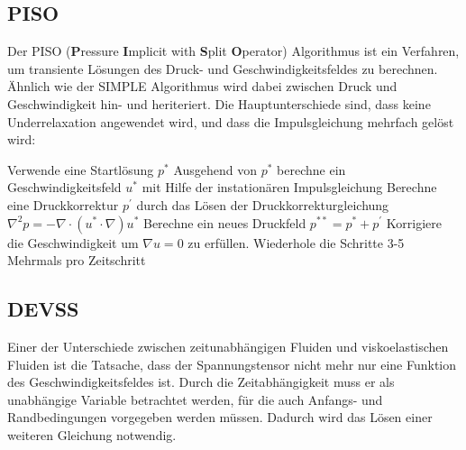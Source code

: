 \subsection{PISO}
Der \mbox{PISO} (\textbf{P}ressure \textbf{I}mplicit with \textbf{S}plit \textbf{O}perator)  Algorithmus ist ein Verfahren, um transiente Lösungen des Druck- und Geschwindigkeitsfeldes zu berechnen.\\
Ähnlich wie der \mbox{SIMPLE} Algorithmus wird dabei zwischen Druck und Geschwindigkeit hin- und heriteriert. Die Hauptunterschiede sind, dass keine Underrelaxation angewendet wird, und dass die Impulsgleichung mehrfach gelöst wird:
\begin{outline}[enumerate]
    \1 Verwende eine Startlösung $p^*$
    \1 Ausgehend von $p^*$ berechne ein Geschwindigkeitsfeld $u^*$ mit Hilfe der instationären Impulsgleichung
    \1 Berechne eine Druckkorrektur $p^{'}$ durch das Lösen der Druckkorrekturgleichung $\nabla^2p=-\nabla \cdot \left( u^*\cdot\nabla \right)u^*$
    \1 Berechne ein neues Druckfeld $p^{**}=p^*+ p^{'}$
    \1 Korrigiere die Geschwindigkeit um $\nabla u=0$ zu erfüllen.
    \1 Wiederhole die Schritte 3-5 Mehrmals pro Zeitschritt
\end{outline}

\subsection{DEVSS}
Einer der Unterschiede zwischen zeitunabhängigen Fluiden und viskoelastischen Fluiden ist die Tatsache, dass der Spannungstensor nicht mehr nur eine Funktion des Geschwindigkeitsfeldes ist. Durch die Zeitabhängigkeit muss er als unabhängige Variable betrachtet werden, für die auch Anfangs- und Randbedingungen vorgegeben werden müssen. Dadurch wird das Lösen einer weiteren Gleichung notwendig.

